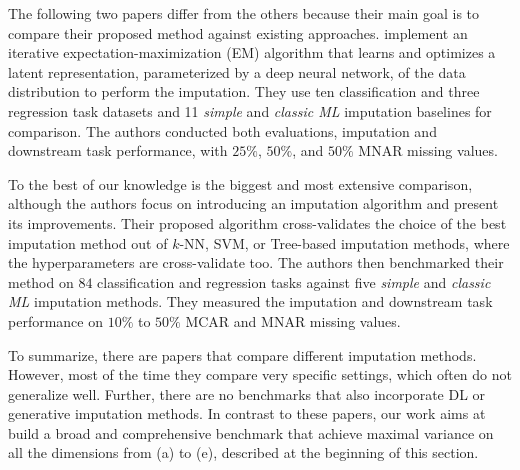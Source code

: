 The following two papers differ from the others because their main goal is to compare their proposed method against existing approaches. \cite{Imputation_Benchmark_6} implement an iterative expectation-maximization (EM) algorithm that learns and optimizes a latent representation, parameterized by a deep neural network, of the data distribution to perform the imputation. They use ten classification and three regression task datasets and 11 \emph{simple} and \emph{classic ML} imputation baselines for comparison. The authors conducted both evaluations, imputation and downstream task performance, with $25\%$, $50\%$, and $50\%$ MNAR missing values.

To the best of our knowledge \citep{Imputation_Benchmark_4} is the biggest and most extensive comparison, although the authors focus on introducing an imputation algorithm and present its improvements. Their proposed algorithm cross-validates the choice of the best imputation method out of $k$-NN, SVM, or Tree-based imputation methods, where the hyperparameters are cross-validate too. The authors then benchmarked their method on $84$ classification and regression tasks against five \emph{simple} and \emph{classic ML} imputation methods. They measured the imputation and downstream task performance on $10\%$ to $50\%$ MCAR and MNAR missing values.

To summarize, there are papers that compare different imputation methods. However, most of the time they compare very specific settings, which often do not generalize well. Further, there are no benchmarks that also incorporate DL or generative imputation methods. In contrast to these papers, our work aims at build a broad and comprehensive benchmark that achieve maximal variance on all the dimensions from (a) to (e), described at the beginning of this section.
